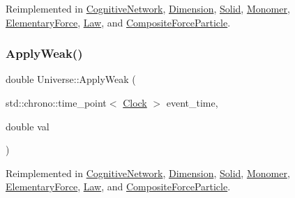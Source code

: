 Reimplemented in \mbox{\hyperlink{classCognitiveNetwork_a8b60fdb81d89a3a74d6c06cb29e7aad3}{Cognitive\+Network}}, \mbox{\hyperlink{classDimension_a2ae0b6a8ee17f6e28b6d2d3209df4bf4}{Dimension}}, \mbox{\hyperlink{classSolid_a07534fa79bb8a6eb32e081e5158ba9e5}{Solid}}, \mbox{\hyperlink{classMonomer_a921f7add2d446b8670513220ace6c4b2}{Monomer}}, \mbox{\hyperlink{classElementaryForce_a185dc4e0b840505df27dbbed9fdcdc7b}{Elementary\+Force}}, \mbox{\hyperlink{classLaw_a266f86cdcc01e813249a2f192ab85eb3}{Law}}, and \mbox{\hyperlink{classCompositeForceParticle_ae0937405e68dd40b19036d5a359f7e07}{Composite\+Force\+Particle}}.

\mbox{\label{classUniverse_a6d1226b3adec3c42a833afdbb6a65a92}} 
\subsubsection{\texorpdfstring{Apply\+Weak()}{ApplyWeak()}}
{\footnotesize\ttfamily double Universe\+::\+Apply\+Weak (\begin{DoxyParamCaption}\item[{std\+::chrono\+::time\+\_\+point$<$ \mbox{\hyperlink{universe_8h_a0ef8d951d1ca5ab3cfaf7ab4c7a6fd80}{Clock}} $>$}]{event\+\_\+time,  }\item[{double}]{val }\end{DoxyParamCaption})\hspace{0.3cm}{\ttfamily [virtual]}}



Reimplemented in \mbox{\hyperlink{classCognitiveNetwork_a46a15b24bd61049fa1c4f635268086a1}{Cognitive\+Network}}, \mbox{\hyperlink{classDimension_a72b8ab8d676b4df6b9a6ef948f5693c9}{Dimension}}, \mbox{\hyperlink{classSolid_a49e35bf258104b7bce225dc21058affb}{Solid}}, \mbox{\hyperlink{classMonomer_a176a1a4dfed1eaddc6637bbfd2660aba}{Monomer}}, \mbox{\hyperlink{classElementaryForce_aabf66a859e6e808a65c6929cd16f7597}{Elementary\+Force}}, \mbox{\hyperlink{classLaw_a96ddd42403e3665c6070283ac201658d}{Law}}, and \mbox{\hyperlink{classCompositeForceParticle_a1fd171a0c6fab0cbf9a45a0d24607bde}{Composite\+Force\+Particle}}.

\mbox{\label{classUniverse_a46a906baabb63e5d31f8b48ea1fae52e}} 
